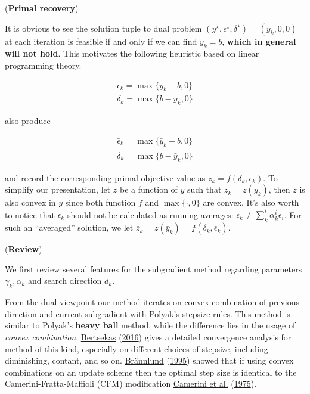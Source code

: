 \documentclass[
  a4paper,
,tablecaptionabove
]{scrartcl}
\numberwithin{equation}{section}
\begin{document}
(\textbf{Primal recovery})

It is obvious to see the solution tuple to dual problem
\((y^\star, \epsilon^\star, \delta^\star) = (y_k, 0, 0)\) at each
iteration is feasible if and only if we can find \(y_k = b\),
\textbf{which in general will not hold}. This motivates the following
heuristic based on linear programming theory.

\[\begin{aligned}
    \epsilon_k = \max\{y_k - b, 0\} \\
    \delta_k = \max\{b - y_k, 0\}
  \end{aligned}\]

also produce

\[\begin{aligned}
    \bar \epsilon_k = \max\{\bar y_k - b, 0\} \\
    \bar \delta_k = \max\{b - \bar y_k, 0\}
  \end{aligned}\]

and record the corresponding primal objective value as
\(z_k = f(\delta_k, \epsilon_k)\). To simplify our presentation, let
\(z\) be a function of \(y\) such that \(z_k = z(y_k)\), then \(z\) is
also convex in \(y\) since both function \(f\) and \(\max\{\cdot, 0\}\)
are convex. It's also worth to notice that \(\bar \epsilon_k\) should
not be calculated as running averages:
\(\bar \epsilon_k \neq \sum^i_k \alpha^i_k \epsilon_i\). For such an
``averaged'' solution, we let
\(\bar z_k = z(\bar y_k) = f(\bar \delta_k, \bar \epsilon_k)\).

(\textbf{Review})

We first review several features for the subgradient method regarding
parameters \(\gamma_k, \alpha_k\) and search direction \(d_k\).

From the dual viewpoint our method iterates on convex combination of
previous direction and current subgradient with Polyak's stepsize rules.
This method is similar to Polyak's \textbf{heavy ball} method, while the
difference lies in the usage of \emph{convex combination}.
\protect\hyperlink{ref-bertsekas_nonlinear_2016}{Bertsekas}
(\protect\hyperlink{ref-bertsekas_nonlinear_2016}{2016}) gives a
detailed convergence analysis for method of this kind, especially on
different choices of stepsize, including diminishing, contant, and so
on. \protect\hyperlink{ref-brannlund1995generalized}{Brännlund}
(\protect\hyperlink{ref-brannlund1995generalized}{1995}) showed that if
using convex combinations on an update scheme then the optimal step size
is identical to the Camerini-Fratta-Maffioli (CFM) modification
\protect\hyperlink{ref-camerini1975improving}{Camerini et al.}
(\protect\hyperlink{ref-camerini1975improving}{1975}).
\end{document}
